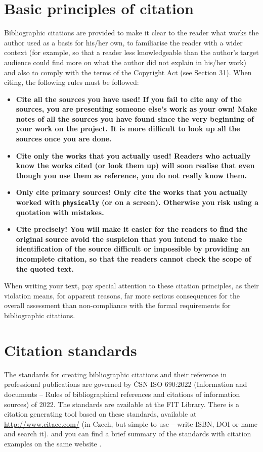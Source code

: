 \section{Basic principles of citation}

Bibliographic citations are provided to make it clear to the reader what works the author used as a basis for his/her own, to familiarise the reader with a wider context (for example, 
so that a reader less knowledgeable than the author's target audience could find more on what the author did not explain in his/her work) and also to comply with the terms of the 
Copyright Act (see Section 31). When citing, the following rules must be followed:

\begin{itemize}
  \item{\bf Cite all the sources you have used! \rm If you fail to cite any of the sources, you are presenting someone else's work as your own! Make notes of all the sources you have found since the very beginning of your work on the project. It is more difficult to look up all the sources once you are done.}
  \item{\bf Cite only the works that you actually used! \rm Readers who actually know the works cited (or look them up) will soon realise that even though you use them as reference, you do not really know them.}
  \item{\bf Only cite primary sources! \rm Only cite the works that you actually worked with \texttt{physically} (or on a screen). Otherwise you risk using a quotation with mistakes.}
  \item{\bf Cite precisely! \rm You will make it easier for the readers to find the original source avoid the suspicion that you intend to make the identification of the source difficult or impossible by providing an incomplete citation, so that the readers cannot check the scope of the quoted text.} 
\end{itemize}

When writing your text, pay special attention to these citation principles, as their violation means, for apparent reasons, far  more serious consequences for the overall assessment than non-compliance with the formal requirements for bibliographic citations.

\section{Citation standards}

The standards for creating bibliographic citations and their reference in professional publications are governed by ČSN ISO 690:2022 (Information and documents -- Rules of bibliographical references and citations of 
information sources) of 2022. The standards are available at the FIT Library. There is a citation generating tool based on these standards, available at \url{http://www.citace.com/} (in Czech, but simple to use -- write ISBN, DOI or name and search it). and you can find a brief summary of the standards with citation examples 
on the same website \cite{biblio}.

